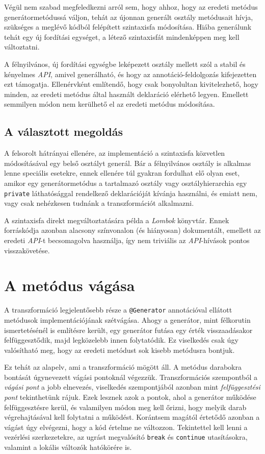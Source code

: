 Végül nem szabad megfeledkezni arról sem, hogy ahhoz, hogy az eredeti metódus generátormetódussá váljon, tehát az újonnan generált osztály metódusait hívja, szükséges a meglévő kódból felépített szintaxisfa módosítása. Hiába generálunk tehát egy új fordítási egységet, a létező szintaxisfát mindenképpen meg kell változtatni.

A félnyilvános, új fordítási egységbe leképezett osztály mellett szól a stabil és kényelmes \textit{API}, amivel generálható, és hogy az annotáció-feldolgozás kifejezetten ezt támogatja. Ellenérvként említendő, hogy csak bonyolultan kivitelezhető, hogy minden, az eredeti metódus által használt deklaráció elérhető legyen. Emellett semmilyen módon nem kerülhető el az eredeti metódus módosítása.

\subsection{A választott megoldás}

A felsorolt hátrányai ellenére, az implementáció a szintaxisfa közvetlen módosításával egy belső osztályt generál. Bár a félnyilvános osztály is alkalmas lenne speciális esetekre, ennek ellenére túl gyakran fordulhat elő olyan eset, amikor egy generátormetódus a tartalmazó osztály vagy osztályhierarchia egy \texttt{private} láthatósággal rendelkező deklarációját kívánja használni, és emiatt nem, vagy csak nehézkesen tudnánk a transzformációt alkalmazni.

A szintaxisfa direkt megváltoztatására példa a \textit{Lombok} könyvtár. Ennek forráskódja azonban alacsony színvonalon (és hiányosan) dokumentált, emellett az eredeti \textit{API}-t becsomagolva használja, így nem triviális az \textit{API}-hívások pontos visszakövetése.

\section{A metódus vágása}

A transzformáció legjelentősebb része a \texttt{@Generator} annotációval ellátott metódusok implementációjának szétvágása. Ahogy a generátor, mint félkorutin ismertetésénél is említésre került, egy generátor futása egy érték visszaadásakor felfüggesztődik, majd legközelebb innen folytatódik. Ez viselkedés csak úgy valósítható meg, hogy az eredeti metódust sok kisebb metódusra bontjuk.

Ez tehát az alapelv, ami a transzformáció mögött áll. A metódus darabokra bontását úgynevezett vágási pontoknál végezzük. Transzformációs szempontból a \textit{vágási pont} a jobb elnevezés, viselkedés szempontjából azonban mint \textit{felfüggesztési pont} tekinthetünk rájuk. Ezek lesznek azok a pontok, ahol a generátor működése felfüggesztésre kerül, és valamilyen módon meg kell őrizni, hogy melyik darab végrehajtásával kell folytatni a működést. Korántsem magától értetődő azonban a vágást úgy elvégezni, hogy a kód értelme ne változzon. Tekintettel kell lenni a vezérlési szerkezetekre, az ugrást megvalósító \texttt{break} és \texttt{continue} utasításokra, valamint a lokális változók hatókörére is.

